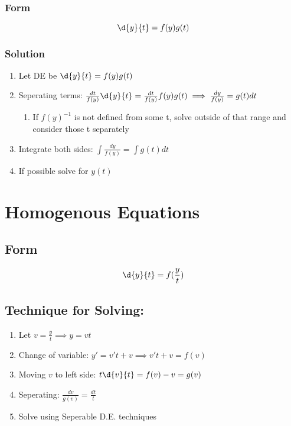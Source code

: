 \documentclass[11pt]{article}
\begin{document}
\subsubsection{Form}
\label{sec-5.1.1}

    \begin{equation}
    \d{y}{t}=f(y)g(t)
    \end{equation}
\subsubsection{Solution}
\label{sec-5.1.2}

\begin{enumerate}
\item Let DE be $\d{y}{t}=f(y)g(t)$
\item Seperating terms: $\frac{dt}{f(y)}\d{y}{t}=\frac{dt}{f(y)}f(y)g(t) \implies \frac{dy}{f(y)}=g(t)dt$

\begin{enumerate}
\item If $f(y)^{-1}$ is not defined from some t, solve outside of
          that range and consider those t separately
\end{enumerate}

\item Integrate both sides: $\int \frac{dy}{f(y)}=\int g(t)dt$
\item If possible solve for $y(t)$
\end{enumerate}
\section{Homogenous Equations}
\label{sec-6}

\subsection{Form}
\label{sec-6.1}

   \begin{equation}
   \d{y}{t}=f(\frac{y}{t})
   \end{equation}
\subsection{Technique for Solving:}
\label{sec-6.2}

\begin{enumerate}
\item Let $v=\frac{y}{t} \implies y=vt$
\item Change of variable: $y'=v't+v \implies v't+v=f(v)$
\item Moving $v$ to left side: $t\d{v}{t}=f(v)-v = g(v)$
\item Seperating: $\frac{dv}{g(v)}=\frac{dt}{t}$
\item Solve using Seperable D.E. techniques
\end{enumerate}
\end{document}

